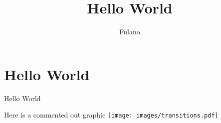 \documentclass[A4paper, 12pt]{article}
\title{Hello World}
\author{Fulano}
\begin{document}
\nocite{*}
\tableofcontents
\maketitle

\cite{asyatoms}

\section{Hello World} %
\label{sec:hello_world}







Hello World


\newpage
Here is a commented out graphic
\newpage
\texttt{[image: images/transitions.pdf]}



\end{document}
